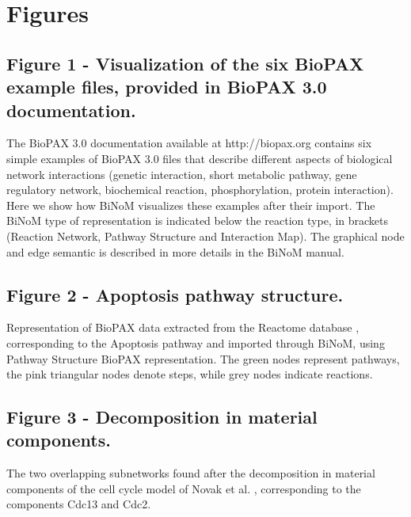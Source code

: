\documentclass[10pt]{bmc_article}
\newenvironment{bmcformat}{\baselineskip20pt\sloppy\setboolean{publ}{false}}{\baselineskip20pt\sloppy}
\begin{document}
\begin{bmcformat}

\section*{Figures}

  \subsection*{Figure 1 - Visualization of the six BioPAX example files, provided in BioPAX 3.0 documentation.}
The BioPAX 3.0 documentation available at http://biopax.org contains six simple examples
of BioPAX 3.0 files that describe different aspects of biological network
interactions (genetic interaction, short metabolic pathway, gene regulatory
network, biochemical reaction, phosphorylation, protein interaction). Here we
show how BiNoM visualizes these examples after their import. The BiNoM type of
representation is indicated below the reaction type, in brackets (Reaction
Network, Pathway Structure and Interaction Map). The graphical node and edge
semantic is described in more details in the BiNoM manual.

  \subsection*{Figure 2 - Apoptosis pathway structure.}
Representation of BioPAX data extracted from the Reactome database
\cite{joshi2005reactome}, corresponding to the Apoptosis pathway and imported through
BiNoM, using Pathway Structure BioPAX representation. The green nodes represent pathways, the pink
triangular nodes denote steps, while grey nodes indicate reactions.

  \subsection*{Figure 3 - Decomposition in material components.}
The two overlapping subnetworks found after the decomposition in material components of the cell cycle model of Novak et al. \cite{novak1998model}, corresponding to the components Cdc13 and
Cdc2.


\end{bmcformat}
\end{document}
